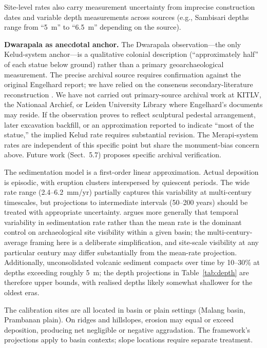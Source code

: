 \documentclass[12pt,a4paper]{article}
\begin{document}
Site-level rates also carry measurement uncertainty from imprecise construction dates and variable depth measurements across sources (e.g., Sambisari depths range from ``5~m'' to ``6.5~m'' depending on the source).

\textbf{Dwarapala as anecdotal anchor.} The Dwarapala observation---the only Kelud-system anchor---is a qualitative colonial description (``approximately half'' of each statue below ground) rather than a primary geoarchaeological measurement. The precise archival source requires confirmation against the original Engelhard report; we have relied on the consensus secondary-literature reconstruction \citep{kinney2003}. We have not carried out primary-source archival work at KITLV, the Nationaal Archief, or Leiden University Library where Engelhard's documents may reside. If the observation proves to reflect sculptural pedestal arrangement, later excavation backfill, or an approximation reported to indicate ``most of the statue,'' the implied Kelud rate requires substantial revision. The Merapi-system rates are independent of this specific point but share the monument-bias concern above. Future work (Sect.~5.7) proposes specific archival verification.

The sedimentation model is a first-order linear approximation. Actual deposition is episodic, with eruption clusters interspersed by quiescent periods. The wide rate range (2.4--6.2~mm/yr) partially captures this variability at multi-century timescales, but projections to intermediate intervals (50--200 years) should be treated with appropriate uncertainty. \citet{ferring1986} argues more generally that temporal variability in sedimentation rate rather than the mean rate is the dominant control on archaeological site visibility within a given basin; the multi-century-average framing here is a deliberate simplification, and site-scale visibility at any particular century may differ substantially from the mean-rate projection. Additionally, unconsolidated volcanic sediment compacts over time by 10--30\% at depths exceeding roughly 5~m; the depth projections in Table~\ref{tab:depth} are therefore upper bounds, with realised depths likely somewhat shallower for the oldest eras.

The calibration sites are all located in basin or plain settings (Malang basin, Prambanan plain). On ridges and hillslopes, erosion may equal or exceed deposition, producing net negligible or negative aggradation. The framework's projections apply to basin contexts; slope locations require separate treatment.
\end{document}
